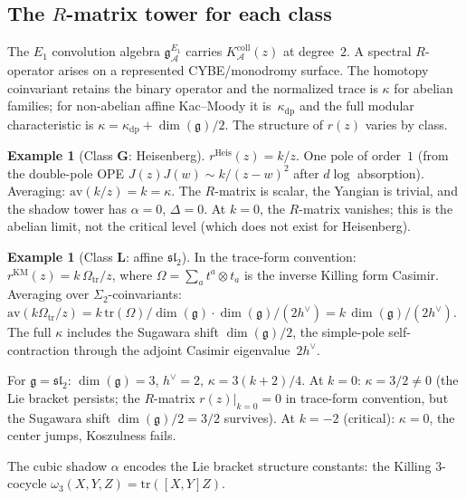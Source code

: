 \documentclass[11pt,reqno]{amsart}
\theoremstyle{definition}
\newtheorem{example}[theorem]{Example}
\theoremstyle{remark}
\newcommand{\cA}{\mathcal{A}}
\newcommand{\fg}{\mathfrak{g}}
\numberwithin{equation}{section}
\begin{document}
\subsection{The $R$-matrix tower for each
class}\label{subsec:r-matrix-tower}

The $E_1$ convolution algebra
$\mathfrak{g}^{E_1}_\cA$ carries
$K_\cA^{\mathrm{coll}}(z)$ at degree~$2$. A spectral $R$-operator
arises on a represented CYBE/monodromy surface. The homotopy
coinvariant retains the binary operator and the normalized trace is
$\kappa$ for abelian families; for non-abelian affine Kac--Moody it
is~$\kappa_{\mathrm{dp}}$ and the full
modular characteristic is
$\kappa = \kappa_{\mathrm{dp}} + \dim(\fg)/2$. The structure of $r(z)$
varies by class.

\begin{example}[Class $\mathbf{G}$:
Heisenberg]\label{ex:r-heis}
$r^{\mathrm{Heis}}(z) = k/z$. One pole of order~$1$ (from
the double-pole OPE $J(z)J(w) \sim k/(z-w)^2$ after
$d\!\log$ absorption). Averaging:
$\mathrm{av}(k/z) = k = \kappa$. The $R$-matrix is scalar,
the Yangian is trivial, and the shadow tower has
$\alpha = 0$, $\Delta = 0$. At $k = 0$, the $R$-matrix
vanishes; this is the abelian limit, not the critical level
(which does not exist for Heisenberg).
\end{example}

\begin{example}[Class $\mathbf{L}$: affine
$\mathfrak{sl}_2$]\label{ex:r-sl2}
In the trace-form convention:
$r^{\mathrm{KM}}(z) = k\,\Omega_{\mathrm{tr}}/z$, where
$\Omega = \sum_a t^a \otimes t_a$ is the inverse Killing
form Casimir.
Averaging over $\Sigma_2$-coinvariants:
$\mathrm{av}(k\Omega_{\mathrm{tr}}/z)
= k\,\mathrm{tr}(\Omega)/\dim(\fg)
\cdot \dim(\fg)/(2h^\vee)
= k\,\dim(\fg)/(2h^\vee)$.
The full $\kappa$ includes the Sugawara shift
$\dim(\fg)/2$, the simple-pole self-contraction through
the adjoint Casimir eigenvalue~$2h^\vee$.

For $\fg = \mathfrak{sl}_2$: $\dim(\fg) = 3$,
$h^\vee = 2$, $\kappa = 3(k+2)/4$.
At $k = 0$: $\kappa = 3/2 \ne 0$ (the Lie bracket
persists; the $R$-matrix
$r(z)|_{k=0} = 0$ in trace-form convention, but the
Sugawara shift $\dim(\fg)/2 = 3/2$ survives).
At $k = -2$ (critical): $\kappa = 0$, the center jumps,
Koszulness fails.

The cubic shadow $\alpha$ encodes the Lie bracket structure
constants: the Killing $3$-cocycle
$\omega_3(X,Y,Z) = \mathrm{tr}([X,Y]Z)$.
\end{example}
\end{document}
